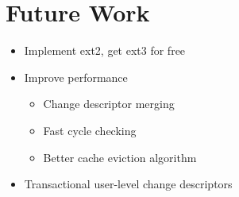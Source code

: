 \section {Future Work}
\label{sec:future}

\begin{itemize}
\item Implement ext2, get ext3 for free
\item Improve performance
\begin{itemize}
\item Change descriptor merging
\item Fast cycle checking
\item Better cache eviction algorithm
\end{itemize}
\item Transactional user-level change descriptors
\end{itemize}

